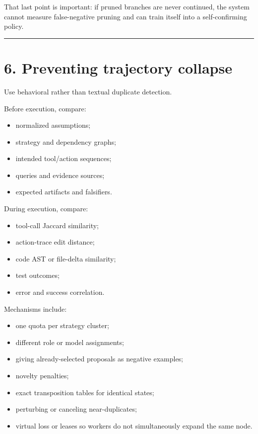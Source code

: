 \documentclass[
  letterpaper,
]{article}
\providecommand{\tightlist}{%
  \setlength{\itemsep}{0pt}\setlength{\parskip}{0pt}}
\begin{document}
That last point is important: if pruned branches are never continued, the system cannot measure false-negative pruning and can train itself into a self-confirming policy.

\begin{center}\rule{0.5\linewidth}{0.5pt}\end{center}

\section{6. Preventing trajectory collapse}\label{preventing-trajectory-collapse}

Use behavioral rather than textual duplicate detection.

Before execution, compare:

\begin{itemize}
\tightlist
\item
  normalized assumptions;
\item
  strategy and dependency graphs;
\item
  intended tool/action sequences;
\item
  queries and evidence sources;
\item
  expected artifacts and falsifiers.
\end{itemize}

During execution, compare:

\begin{itemize}
\tightlist
\item
  tool-call Jaccard similarity;
\item
  action-trace edit distance;
\item
  code AST or file-delta similarity;
\item
  test outcomes;
\item
  error and success correlation.
\end{itemize}

Mechanisms include:

\begin{itemize}
\tightlist
\item
  one quota per strategy cluster;
\item
  different role or model assignments;
\item
  giving already-selected proposals as negative examples;
\item
  novelty penalties;
\item
  exact transposition tables for identical states;
\item
  perturbing or canceling near-duplicates;
\item
  virtual loss or leases so workers do not simultaneously expand the same node.
\end{itemize}
\end{document}
